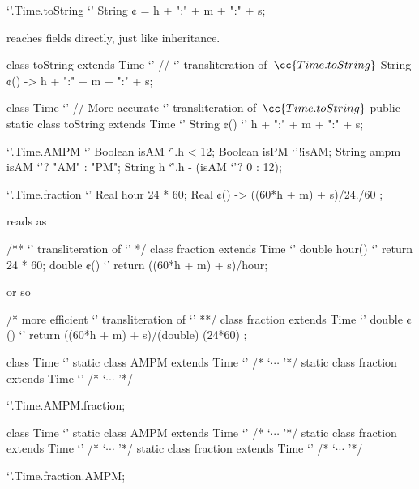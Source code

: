\begin{reap}
  `'.Time.toString {`'
    String ¢ = h + ":" + m + ":" + s;
  }
\end{reap}
reaches fields directly, just like inheritance.
\begin{java}
  class toString extends Time {`' // `\Java' transliteration of~$\cc{Time.toString}$
    String ¢() -> h + ":" + m + ":" + s;
  }
\end{java}
\begin{java}
  class Time {`' // More accurate `\Java' transliteration of~$\cc{Time.toString}$
    public static class toString extends Time {`'
      String ¢() {`'
        h + ":" + m + ":" + s;
      }
    }
  }
\end{java}
\begin{reap}
  `'.Time.AMPM {`'
    Boolean isAM `\^'.h < 12;
    Boolean isPM `'!isAM;
    String ampm isAM `'? "AM" : "PM";
    String h `\^'.h - (isAM `'? 0 : 12);
  }
\end{reap}
\begin{reap}
  `'.Time.fraction {`'
    Real hour 24 * 60;
    Real ¢() -> ((60*h + m) + s)/24./60 ;
  }
\end{reap}
reads as
\begin{java}
  /** `\Java' transliteration of `'
  */
  class fraction extends Time {`'
    double hour() {`' return 24 * 60; }
    double ¢() {`' return ((60*h + m) + s)/hour; }
  }
\end{java}
or so
\begin{java}
  /* more efficient `\Java' transliteration of `'
  **/
  class fraction extends Time {`'
    double ¢() {`' return ((60*h + m) + s)/(double) (24*60) ; }
  }
\end{java}
\begin{java}
  class Time {`'
    static class AMPM extends Time {`' /* `$⋯$ '*/ }
    static class fraction extends Time {`' /* `$⋯$ '*/}
  }
\end{java}
\begin{reap}
  `'.Time.AMPM.fraction;
\end{reap}
\begin{java}
  class Time {`'
    static class AMPM extends Time {`'
      /* `$⋯$ '*/
      static class fraction extends Time {`' /* `$⋯$ '*/}
    }
    static class fraction extends Time {`' /* `$⋯$ '*/}
  }
\end{java}
\begin{reap}
  `'.Time.fraction.AMPM;
\end{reap}
